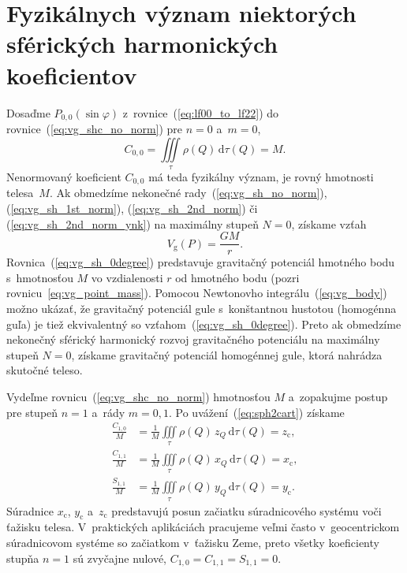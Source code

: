 \documentclass[a4paper,12pt]{book}
\newcommand{\diff}{\mathrm d}
\newcommand{\gidx}{\mathrm g}
\begin{document}

\section{Fyzikálnych význam niektorých sférických harmonických koeficientov}
\label{sec:physical_meaning_of_spherical_harmonic_coefficients}

Dosaďme $P_{0,0}(\sin\varphi)$ z~rovnice~(\ref{eq:lf00_to_lf22})
do rovnice~(\ref{eq:vg_shc_no_norm}) pre $n = 0$ a~$m = 0$,
%
\begin{equation}
\label{eq:c00_mass}
C_{0,0} = \iiint\limits_{\tau} \rho(Q) \, \diff \tau(Q) = M{.}
\end{equation}
%
Nenormovaný koeficient $C_{0,0}$ má teda fyzikálny význam, je rovný hmotnosti 
telesa~$M$.  Ak obmedzíme nekonečné rady~(\ref{eq:vg_sh_no_norm}), 
(\ref{eq:vg_sh_1st_norm}), (\ref{eq:vg_sh_2nd_norm}) či 
(\ref{eq:vg_sh_2nd_norm_ynk}) na maximálny stupeň $N = 0$, získame vzťah
%
\begin{equation}
\label{eq:vg_sh_0degree}
V_\gidx(P) = \frac{GM}{r}{.}
\end{equation}
%
Rovnica~(\ref{eq:vg_sh_0degree}) predstavuje gravitačný potenciál hmotného bodu
s~hmotnosťou $M$ vo vzdialenosti $r$ od hmotného bodu (pozri
rovnicu~\ref{eq:vg_point_mass}).  Pomocou Newtonovho
integrálu~(\ref{eq:vg_body}) možno ukázať, že gravitačný potenciál gule
s~konštantnou hustotou (homogénna guľa) je tiež ekvivalentný so
vzťahom~(\ref{eq:vg_sh_0degree}).  Preto ak obmedzíme nekonečný sférický
harmonický rozvoj gravitačného potenciálu na maximálny stupeň $N = 0$, získame
gravitačný potenciál homogénnej gule, ktorá nahrádza skutočné teleso.

Vydeľme rovnicu~(\ref{eq:vg_shc_no_norm}) hmotnosťou $M$ a~zopakujme postup pre
stupeň $n = 1$ a~rády $m = 0, 1$.  Po uvážení~(\ref{eq:sph2cart}) získame
%
\begin{equation}
\begin{split}
\frac{C_{1,0}}{M} &= \frac{1}{M} \iiint\limits_{\tau} \rho(Q) \, z_Q \, \diff 
\tau(Q) = z_\mathrm{c}{,}\\
\frac{C_{1,1}}{M} &= \frac{1}{M} \iiint\limits_{\tau} \rho(Q) \, x_Q \, \diff 
\tau(Q) = x_\mathrm{c}{,}\\
\frac{S_{1,1}}{M} &= \frac{1}{M} \iiint\limits_{\tau} \rho(Q) \, y_Q \, \diff 
\tau(Q) = y_\mathrm{c}{.}
\end{split}
\end{equation}
%
Súradnice $x_\mathrm{c}$, $y_\mathrm{c}$ a~$z_\mathrm{c}$ predstavujú posun
začiatku súradnicového systému voči ťažisku telesa.  V~praktických aplikáciách 
pracujeme veľmi často v~geocentrickom súradnicovom systéme so
začiatkom v~ťažisku Zeme, preto všetky koeficienty stupňa $n = 1$ sú zvyčajne
nulové, $C_{1,0} = C_{1,1} = S_{1,1} = 0$.
\end{document}
